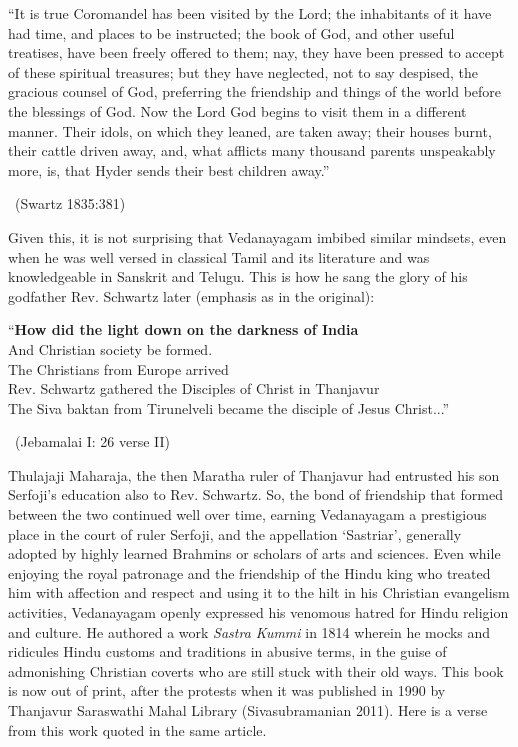 \begin{myquote}
“It is true Coromandel has been visited by the Lord; the inhabitants of it have had time, and places to be instructed; the book of God, and other useful treatises, have been freely offered to them; nay, they have been pressed to accept of these spiritual treasures; but they have neglected, not to say despised, the gracious counsel of God, preferring the friendship and things of the world before the blessings of God. Now the Lord God begins to visit them in a different manner. Their idols, on which they leaned, are taken away; their houses burnt, their cattle driven away, and, what afflicts many thousand parents unspeakably more, is, that Hyder sends their best children away.” 

~\hfill (Swartz 1835:381)
\end{myquote}

\newpage

Given this, it is not surprising that Vedanayagam imbibed similar mindsets, even when he was well versed in classical Tamil and its literature and was knowledgeable in Sanskrit and Telugu. This is how he sang the glory of his godfather Rev. Schwartz later (emphasis as in the original):

\begin{myquote}
“\textbf{How did the light down on the darkness of India}\\ And Christian society be formed.\\ The Christians from Europe arrived\\ Rev. Schwartz gathered the Disciples of Christ in Thanjavur\\ The Siva baktan from Tirunelveli became the disciple of Jesus Christ...” 

~\hfill (Jebamalai I: 26 verse II)
\end{myquote}

Thulajaji Maharaja, the then Maratha ruler of Thanjavur had entrusted his son Serfoji’s education also to Rev. Schwartz. So, the bond of friendship that formed between the two continued well over time, earning Vedanayagam a prestigious place in the court of ruler Serfoji, and the appellation ‘Sastriar’, generally adopted by highly learned Brahmins or scholars of arts and sciences. Even while enjoying the royal patronage and the friendship of the Hindu king who treated him with affection and respect and using it to the hilt in his Christian evangelism activities, Vedanayagam openly expressed his venomous hatred for Hindu religion and culture. He authored a work \textit{Sastra Kummi} in 1814 wherein he mocks and ridicules Hindu customs and traditions in abusive terms, in the guise of admonishing Christian coverts who are still stuck with their old ways. This book is now out of print, after the protests when it was published in 1990 by Thanjavur Saraswathi Mahal Library (Sivasubramanian 2011). Here is a verse from this work quoted in the same article.


